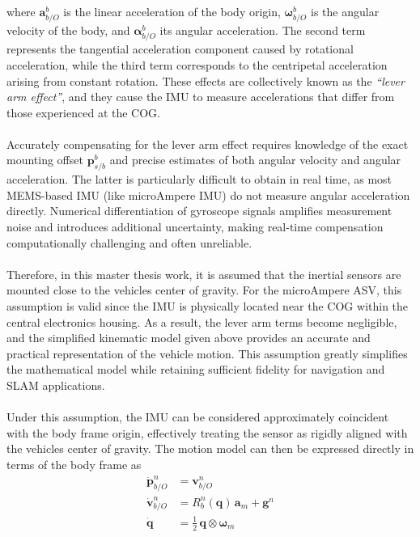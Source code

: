 where $\mathbf{a}_{b/O}^{b}$ is the linear acceleration of the body origin, $\boldsymbol{\omega}_{b/O}^{b}$ is the angular velocity of the body, and $\boldsymbol{\alpha}_{b/O}^{b}$ its angular acceleration. The second term represents the tangential acceleration component caused by rotational acceleration, while the third term corresponds to the centripetal acceleration arising from constant rotation. These effects are collectively known as the \textit{``lever arm effect''}, and they cause the IMU to measure accelerations that differ from those experienced at the COG.  
\\ \\
Accurately compensating for the lever arm effect requires knowledge of the exact mounting offset $\mathbf{p}_{s/b}^{b}$ and precise estimates of both angular velocity and angular acceleration. The latter is particularly difficult to obtain in real time, as most MEMS-based IMU (like microAmpere IMU) do not measure angular acceleration directly. Numerical differentiation of gyroscope signals amplifies measurement noise and introduces additional uncertainty, making real-time compensation computationally challenging and often unreliable.  
\\ \\
Therefore, in this master thesis work, it is assumed that the inertial sensors are mounted close to the vehicles center of gravity. For the microAmpere ASV, this assumption is valid since the IMU is physically located near the COG within the central electronics housing. As a result, the lever arm terms become negligible, and the simplified kinematic model given above provides an accurate and practical representation of the vehicle motion. This assumption greatly simplifies the mathematical model while retaining sufficient fidelity for navigation and SLAM applications.  
\\ \\
Under this assumption, the IMU can be considered approximately coincident with the body frame origin, effectively treating the sensor as rigidly aligned with the vehicles center of gravity. The motion model can then be expressed directly in terms of the body frame as
$$
\begin{aligned}
    \dot{\mathbf{p}}_{b/O}^{n} &= \mathbf{v}_{b/O}^{n} \\
    \dot{\mathbf{v}}_{b/O}^{n} &= R_b^n(\mathbf{q})\,\mathbf{a}_m + \mathbf{g}^n \\
    \dot{\mathbf{q}} &= \tfrac{1}{2}\,\mathbf{q} \otimes \boldsymbol{\omega}_m
\end{aligned}
$$
